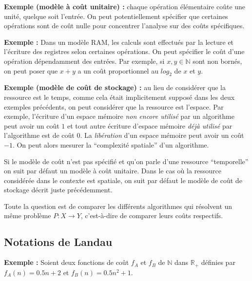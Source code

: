 \documentclass[../../../main.tex]{subfiles}
\begin{document}
\textbf{Exemple (modèle à coût unitaire) :} chaque opération élémentaire coûte une unité, quelque soit l'entrée. On peut potentiellement spécifier que certaines opérations sont de coût nulle pour concentrer l'analyse sur des coûts spécifiques.

\textbf{Exemple :} Dans un modèle RAM, les calculs sont effectués par la lecture et l'écriture des registres selon certaines opérations. On peut spécifier le coût d'une opération dépendamment des entrées. Par exemple, si $x, y\in\mathbb{N}$ sont non bornés, on peut poser que $x + y$ a un coût proportionnel au $log_2$ de $x$ et $y$.

\textbf{Exemple (modèle de coût de stockage) :} au lieu de considérer que la ressource est le temps, comme cela était implicitement supposé dans les deux exemples précédents, on peut considérer que la ressource est l'espace. Par exemple, l'écriture d'un espace mémoire \textit{non encore utilisé} par un algorithme peut avoir un coût $1$ et tout autre écriture d'espace mémoire \textit{déjà utilisé} par l'algorithme est de coût $0$. La  \textit{libération} d'un espace mémoire peut avoir un coût $-1$. On peut alors mesurer la ``complexité spatiale'' d'un algorithme.

Si le modèle de coût n'est pas spécifié et qu'on parle d'une ressource ``temporelle'' on suit par défaut un modèle à coût unitaire. Dans le cas où la ressource considérée dans le contexte est spatiale, on suit par défaut le modèle de coût de stockage décrit juste précédemment.

Toute la question est de comparer les différents algorithmes qui résolvent un même problème $P:X\rightarrow Y$, c'est-à-dire de comparer leurs coûts respectifs.
\subsection{Notations de Landau}
\textbf{Exemple :} Soient deux fonctions de coût $f_A$ et $f_B$ de $\mathbb{N}$ dans $\mathbb{R}_+$ définies par $f_A(n) = 0.5n + 2$ et $f_B(n) = 0.5n^2 + 1$.
\end{document}

